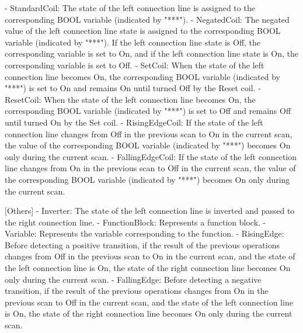 \begin{shk}
[Coil]
- StandardCoil: The state of the left connection line is assigned to the corresponding BOOL variable (indicated by "***").
- NegatedCoil: The negated value of the left connection line state is assigned to the corresponding BOOL variable (indicated by "***"). If the left connection line state is Off, the corresponding variable is set to On, and if the left connection line state is On, the corresponding variable is set to Off.
- SetCoil: When the state of the left connection line becomes On, the corresponding BOOL variable (indicated by "***") is set to On and remains On until turned Off by the Reset coil.
- ResetCoil: When the state of the left connection line becomes On, the corresponding BOOL variable (indicated by "***") is set to Off and remains Off until turned On by the Set coil.
- RisingEdgeCoil: If the state of the left connection line changes from Off in the previous scan to On in the current scan, the value of the corresponding BOOL variable (indicated by "***") becomes On only during the current scan.
- FallingEdgeCoil: If the state of the left connection line changes from On in the previous scan to Off in the current scan, the value of the corresponding BOOL variable (indicated by "***") becomes On only during the current scan.

[Others]
- Inverter: The state of the left connection line is inverted and passed to the right connection line.
- FunctionBlock: Represents a function block.
- Variable: Represents the variable corresponding to the function.
- RisingEdge: Before detecting a positive transition, if the result of the previous operations changes from Off in the previous scan to On in the current scan, and the state of the left connection line is On, the state of the right connection line becomes On only during the current scan.
- FallingEdge: Before detecting a negative transition, if the result of the previous operations changes from On in the previous scan to Off in the current scan, and the state of the left connection line is On, the state of the right connection line becomes On only during the current scan.
\end{shk}
\noindent\begin{minipage}{\textwidth}
\captionsetup{type=figure}
\end{minipage}


